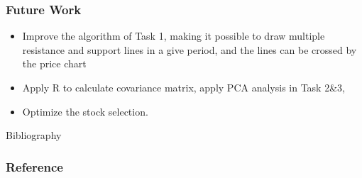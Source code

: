 \documentclass[compress,handout,10pt]{beamer}
\let\olditem\item
\renewcommand{\item}{\setlength{\itemsep}{0.5\baselineskip}\olditem}
\begin{document}
\begin{frame}
    \frametitle{Future Work}
\begin {itemize}
\item Improve the algorithm of Task 1, making it possible to draw multiple resistance and support lines in a give period, and the lines can be crossed by the price chart
\item Apply R to calculate covariance matrix, apply PCA analysis in Task 2\&3,
\item Optimize the stock selection.
\end{itemize}
\end{frame}

\begin{frame}[allowframebreaks]{Bibliography}
\frametitle{Reference}

\nocite{*}

\end{frame}
\end{document}
